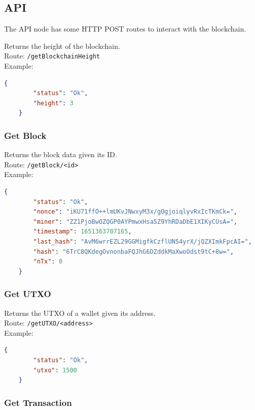 \documentclass[../documentation.tex]{subfiles}
\begin{document}
\pagebreak

\subsection{API}

The API node has some HTTP POST routes to interact with the blockchain.


Returns the height of the blockchain.
\\
Route: \texttt{/getBlockchainHeight}
\\
Example:
\begin{lstlisting}[language=json]
    {
        "status": "Ok",
        "height": 3
    }
\end{lstlisting}

\subsubsection{Get Block}

Returns the block data given its ID.
\\
Route: \texttt{/getBlock/<id>}
\\
Example:
\begin{lstlisting}[language=json]
    {
        "status": "Ok",
        "nonce": "iKU71ffO++lmUKvJNwxyM3x/gOgjoiqlyvRxIcTKmCk=",
        "miner": "ZZ1PjoBwOZQGP0AYPmwxHsa5Z9YhRDaDbE1XIKyCUsA=",
        "timestamp": 1651363707165,
        "last_hash": "AvM6wrrEZL29GGMigfkCzflUN54yrX/jQZXImkFpcAI=",
        "hash": "6TrC8QKdegOvnonbaFQJhG6DZddkMaXwoOdst9tC+8w=",
        "nTx": 0
    }
\end{lstlisting}

\subsubsection{Get UTXO}

Returns the UTXO of a wallet given its address.
\\
Route: \texttt{/getUTXO/<address>}
\\
Example:
\begin{lstlisting}[language=json]
    {
        "status": "Ok",
        "utxo": 1500
    }
\end{lstlisting}

\pagebreak

\subsubsection{Get Transaction}
\end{document}
